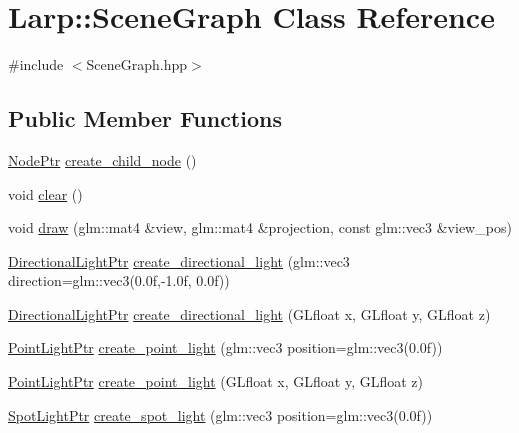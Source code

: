 \hypertarget{classLarp_1_1SceneGraph}{}\section{Larp\+:\+:Scene\+Graph Class Reference}
\label{classLarp_1_1SceneGraph}


{\ttfamily \#include $<$Scene\+Graph.\+hpp$>$}

\subsection*{Public Member Functions}
\begin{DoxyCompactItemize}
\item 
\hyperlink{namespaceLarp_a171c1dc8b70cfb441b15d7386780db23}{Node\+Ptr} \hyperlink{classLarp_1_1SceneGraph_abd2f09bea39c3e15a4c5cd2d9ee7e6a3}{create\+\_\+child\+\_\+node} ()
\item 
void \hyperlink{classLarp_1_1SceneGraph_a21ef2624b18a0e9a0df2ee52db762447}{clear} ()
\item 
void \hyperlink{classLarp_1_1SceneGraph_a128e99a53cc4d30fd3f8f7722194029c}{draw} (glm\+::mat4 \&view, glm\+::mat4 \&projection, const glm\+::vec3 \&view\+\_\+pos)
\item 
\hyperlink{namespaceLarp_a38725e08be7b2ebb94f5f71eb0f0c692}{Directional\+Light\+Ptr} \hyperlink{classLarp_1_1SceneGraph_a2ea4b90cad2ede8c1be6c01515779706}{create\+\_\+directional\+\_\+light} (glm\+::vec3 direction=glm\+::vec3(0.\+0f,-\/1.\+0f, 0.\+0f))
\item 
\hyperlink{namespaceLarp_a38725e08be7b2ebb94f5f71eb0f0c692}{Directional\+Light\+Ptr} \hyperlink{classLarp_1_1SceneGraph_a899003e8ceeafd20527d88b0bc08a668}{create\+\_\+directional\+\_\+light} (G\+Lfloat x, G\+Lfloat y, G\+Lfloat z)
\item 
\hyperlink{namespaceLarp_a07215808e8e3c5229ca8549c5450e3e5}{Point\+Light\+Ptr} \hyperlink{classLarp_1_1SceneGraph_ad1fbe775246af5c803396419bd2ea92c}{create\+\_\+point\+\_\+light} (glm\+::vec3 position=glm\+::vec3(0.\+0f))
\item 
\hyperlink{namespaceLarp_a07215808e8e3c5229ca8549c5450e3e5}{Point\+Light\+Ptr} \hyperlink{classLarp_1_1SceneGraph_a5813e7764c57bdbf8395bc4e26b689e1}{create\+\_\+point\+\_\+light} (G\+Lfloat x, G\+Lfloat y, G\+Lfloat z)
\item 
\hyperlink{namespaceLarp_a5366be98946441fcea9b8a155bc52d95}{Spot\+Light\+Ptr} \hyperlink{classLarp_1_1SceneGraph_a4ccb8a5962aec36423c0b1e70a7b8b02}{create\+\_\+spot\+\_\+light} (glm\+::vec3 position=glm\+::vec3(0.\+0f))

\end{DoxyCompactItemize}
